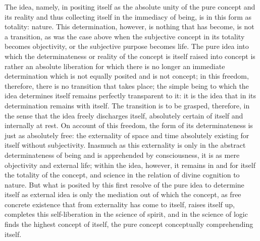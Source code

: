 The idea, namely, in positing itself
as the absolute unity of the pure concept and its reality
and thus collecting itself in the immediacy of being,
is in this form as totality:  nature.
This determination, however, is nothing that has become,
is not a transition, as was the case above
when the subjective concept in its totality becomes objectivity,
or the subjective purpose becomes life.
The pure idea into which the determinateness
or reality of the concept is itself
raised into concept is rather an
absolute liberation for which
there is no longer an immediate determination
which is not equally posited and is not concept;
in this freedom, therefore, there is
no transition that takes place;
the simple being to which the idea determines itself
remains perfectly transparent to it:
it is the idea that in its determination remains with itself.
The transition is to be grasped, therefore,
in the sense that the idea freely discharges itself,
absolutely certain of itself and internally at rest.
On account of this freedom, the form of
its determinateness is just as absolutely free:
the externality of space and time absolutely existing
for itself without subjectivity.
Inasmuch as this externality is only
in the abstract determinateness of being
and is apprehended by consciousness,
it is as mere objectivity and external life;
within the idea, however, it remains in
and for itself the totality of the concept,
and science in the relation of
divine cognition to nature.
But what is posited by this first resolve
of the pure idea to determine itself as external idea
is only the mediation out of which the concept,
as free concrete existence that from externality
has come to itself, raises itself up,
completes this self-liberation in the science of spirit,
and in the science of logic finds the highest concept of itself,
the pure concept conceptually comprehending itself.
